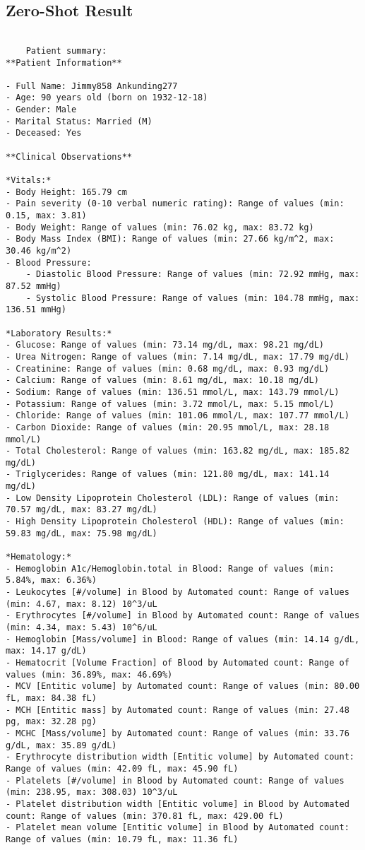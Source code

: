 \break
\subsection{Zero-Shot Result}
\begin{lstlisting}
    
    Patient summary:
**Patient Information**

- Full Name: Jimmy858 Ankunding277
- Age: 90 years old (born on 1932-12-18)
- Gender: Male
- Marital Status: Married (M)
- Deceased: Yes

**Clinical Observations**

*Vitals:*
- Body Height: 165.79 cm
- Pain severity (0-10 verbal numeric rating): Range of values (min: 0.15, max: 3.81)
- Body Weight: Range of values (min: 76.02 kg, max: 83.72 kg)
- Body Mass Index (BMI): Range of values (min: 27.66 kg/m^2, max: 30.46 kg/m^2)
- Blood Pressure:
    - Diastolic Blood Pressure: Range of values (min: 72.92 mmHg, max: 87.52 mmHg)
    - Systolic Blood Pressure: Range of values (min: 104.78 mmHg, max: 136.51 mmHg)

*Laboratory Results:*
- Glucose: Range of values (min: 73.14 mg/dL, max: 98.21 mg/dL)
- Urea Nitrogen: Range of values (min: 7.14 mg/dL, max: 17.79 mg/dL)
- Creatinine: Range of values (min: 0.68 mg/dL, max: 0.93 mg/dL)
- Calcium: Range of values (min: 8.61 mg/dL, max: 10.18 mg/dL)
- Sodium: Range of values (min: 136.51 mmol/L, max: 143.79 mmol/L)
- Potassium: Range of values (min: 3.72 mmol/L, max: 5.15 mmol/L)
- Chloride: Range of values (min: 101.06 mmol/L, max: 107.77 mmol/L)
- Carbon Dioxide: Range of values (min: 20.95 mmol/L, max: 28.18 mmol/L)
- Total Cholesterol: Range of values (min: 163.82 mg/dL, max: 185.82 mg/dL)
- Triglycerides: Range of values (min: 121.80 mg/dL, max: 141.14 mg/dL)
- Low Density Lipoprotein Cholesterol (LDL): Range of values (min: 70.57 mg/dL, max: 83.27 mg/dL)
- High Density Lipoprotein Cholesterol (HDL): Range of values (min: 59.83 mg/dL, max: 75.98 mg/dL)

*Hematology:*
- Hemoglobin A1c/Hemoglobin.total in Blood: Range of values (min: 5.84%, max: 6.36%)
- Leukocytes [#/volume] in Blood by Automated count: Range of values (min: 4.67, max: 8.12) 10^3/uL
- Erythrocytes [#/volume] in Blood by Automated count: Range of values (min: 4.34, max: 5.43) 10^6/uL
- Hemoglobin [Mass/volume] in Blood: Range of values (min: 14.14 g/dL, max: 14.17 g/dL)
- Hematocrit [Volume Fraction] of Blood by Automated count: Range of values (min: 36.89%, max: 46.69%)
- MCV [Entitic volume] by Automated count: Range of values (min: 80.00 fL, max: 84.38 fL)
- MCH [Entitic mass] by Automated count: Range of values (min: 27.48 pg, max: 32.28 pg)
- MCHC [Mass/volume] by Automated count: Range of values (min: 33.76 g/dL, max: 35.89 g/dL)
- Erythrocyte distribution width [Entitic volume] by Automated count: Range of values (min: 42.09 fL, max: 45.90 fL)
- Platelets [#/volume] in Blood by Automated count: Range of values (min: 238.95, max: 308.03) 10^3/uL
- Platelet distribution width [Entitic volume] in Blood by Automated count: Range of values (min: 370.81 fL, max: 429.00 fL)
- Platelet mean volume [Entitic volume] in Blood by Automated count: Range of values (min: 10.79 fL, max: 11.36 fL)


\end{lstlisting}
